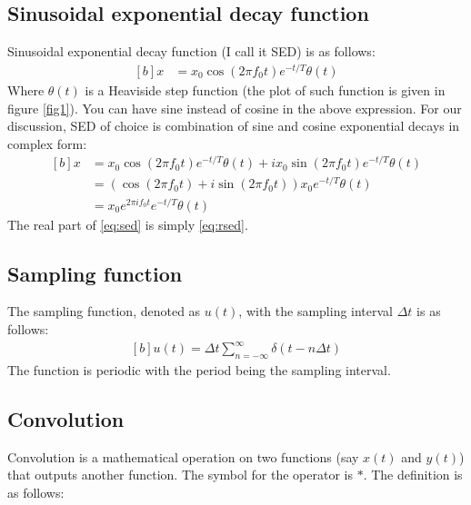 \documentclass[letterpaper, 11pt]{article}
\newcommand{\sed}[2]{#2_{0}e^{2\pi if_{0}#1}e^{-#1/T} \theta (#1)} %
\newcommand{\fsum}[1]{\sum_{#1 = -\infty}^{\infty}} %
\newcommand{\spf}[2]{\Delta #1 \fsum{#2} \delta (#1 - #2 \Delta #1)} %
\numberwithin{equation}{section}
\numberwithin{figure}{section}
\numberwithin{table}{section}
\begin{document}
\subsection{Sinusoidal exponential decay function}
Sinusoidal exponential decay function (I call it SED) is as follows:
\begin{equation}
	\begin{aligned}[b]
		x &= x_{0}\cos{(2\pi f_{0}t)}e^{-t/T} \theta(t)
		\label{eq:rsed}
	\end{aligned}
\end{equation}
Where \(\theta (t)\) is a Heaviside step function (the plot of such function is given in figure \ref{fig1}). You can have sine instead of cosine in the above expression. For our discussion, SED of choice is combination of sine and cosine exponential decays in complex form:
\begin{equation}
	\begin{aligned}[b]
		x	&= x_{0}\cos{(2\pi f_{0}t)}e^{-t/T} \theta(t)+ i x_{0}\sin{(2\pi f_{0}t)}e^{-t/T} \theta(t)\\
			&= (\cos{(2\pi f_{0}t)} +i \sin{(2\pi f_{0}t)})x_{0}e^{-t/T} \theta(t) \\
			&= \sed{t}{x}
			\label{eq:sed}
	\end{aligned}
\end{equation}
The real part of \eqref{eq:sed} is simply \eqref{eq:rsed}.

\subsection{Sampling function}
The sampling function, denoted as \(u(t)\), with the sampling interval \(\Delta t\) is as follows:
\begin{equation}
	\begin{aligned}[b]
		u(t) = \spf{t}{n}
	\end{aligned}
\end{equation}
The function is periodic with the period being the sampling interval. 

\subsection{Convolution}
Convolution is a mathematical operation on two functions (say \(x(t)\) and \(y(t)\)) that outputs another function. The symbol for the operator is \(*\). The definition is as follows:
\end{document}
